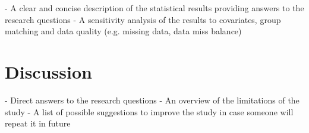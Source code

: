 \documentclass[]{article}
\begin{document}
\begin{multicols}{2}
- A clear and concise description of the statistical results 
providing answers to the research questions
\newline
- A sensitivity analysis of the results to covariates, group matching and data quality (e.g. missing data, data miss balance)

\section{Discussion}

- Direct answers to the research questions
\newline
- An overview of the limitations of the study
\newline
- A list of possible suggestions to improve the study in case 
someone will repeat it in future

\end{multicols}

\printbibliography
\end{document}
